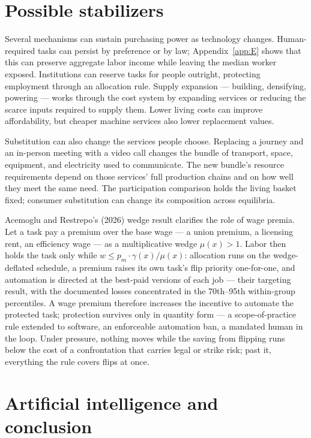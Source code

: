 \documentclass[12pt]{article}
\theoremstyle{plain}
\begin{document}
\section{Possible stabilizers}\label{sec:10}

Several mechanisms can sustain purchasing power as technology changes. Human-required tasks can persist by preference or by law; Appendix~\ref{app:E} shows that this can preserve aggregate labor income while leaving the median worker exposed. Institutions can reserve tasks for people outright, protecting employment through an allocation rule. Supply expansion --- building, densifying, powering --- works through the cost system by expanding services or reducing the scarce inputs required to supply them. Lower living costs can improve affordability, but cheaper machine services also lower replacement values.

Substitution can also change the services people choose. Replacing a journey and an in-person meeting with a video call changes the bundle of transport, space, equipment, and electricity used to communicate. The new bundle's resource requirements depend on those services' full production chains and on how well they meet the same need. The participation comparison holds the living basket fixed; consumer substitution can change its composition across equilibria.

Acemoglu and Restrepo's (2026) wedge result clarifies the role of wage premia. Let a task pay a premium over the base wage --- a union premium, a licensing rent, an efficiency wage --- as a multiplicative wedge $\mu (x) > 1$. Labor then holds the task only while $w \le p_m\cdot \gamma (x)/\mu (x)$: allocation runs on the wedge-deflated schedule, a premium raises its own task's flip priority one-for-one, and automation is directed at the best-paid versions of each job --- their targeting result, with the documented losses concentrated in the 70th--95th within-group percentiles. A wage premium therefore increases the incentive to automate the protected task; protection survives only in quantity form --- a scope-of-practice rule extended to software, an enforceable automation ban, a mandated human in the loop. Under pressure, nothing moves while the saving from flipping runs below the cost of a confrontation that carries legal or strike risk; past it, everything the rule covers flips at once.

\section{Artificial intelligence and conclusion}\label{sec:11}
\end{document}
